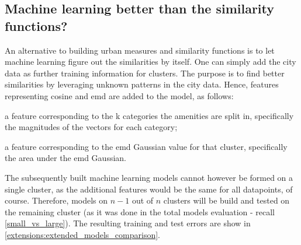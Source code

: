\subsection{Machine learning better than the similarity functions?}
\label{extensions:machine_learning_better}
An alternative to building urban measures and similarity functions is to let machine learning figure out the similarities by itself. One can simply add the city data as further training information for clusters. The purpose is to find better similarities by leveraging unknown patterns in the city data. Hence, features representing cosine and emd are added to the model, as follows: 
\begin{itemlist}
	\item a feature corresponding to the k categories the amenities are split in, specifically the magnitudes of the vectors for each category;
	\item a feature corresponding to the emd Gaussian value for that cluster, specifically the area under the emd Gaussian.
\end{itemlist}
The subsequently built machine learning models cannot however be formed on a single cluster, as the additional features would be the same for all datapoints, of course. Therefore, models on $n-1$ out of $n$ clusters will be build and tested on the remaining cluster (as it was done in the total models evaluation - recall \ref{small_vs_large}). The resulting training and test errors are show in \ref{extensions:extended_models_comparison}. 

